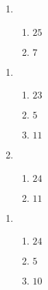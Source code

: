 \documentclass[12pt,twoside]{article}
\makeatletter
\def\emptycleardoublepage{\clearpage\if@twoside \ifodd\c@page\else
\thispagestyle{empty}%
\hbox{}\newpage\if@twocolumn\hbox{}\newpage\fi\fi\fi}
\makeatother
\begin{document}
\begin{multicols}{2}
\begin{enumerate}
\item \begin{enumerate}
\def \a{8}\def \b{17}\def \apb{25}
\item $\apb$
\def \a{10}\def \dif{7}\def \b{3}
\item $\dif$
\def \vshift{5}\def \hshift{4}\def \chang{0}\def \findval{4}\def \yval{5}
\end{enumerate}
\end{enumerate}\end{multicols}\emptycleardoublepage{}\graphicspath{{C:/Users/iainc/anaconda3/Randomizer/Sample Course/Sample Assessment 2/}}\begin{multicols}{2} \begin{enumerate}
\item \begin{enumerate}
\def \a{6}\def \b{17}\def \apb{23}
\item $\apb$
\def \a{12}\def \dif{5}\def \b{7}
\item $\dif$
\def \a{2}\def \b{9}\def \ab{11}
\item $\ab$
\def \vshift{1}\def \hshift{-4}\def \chang{-1}\def \findval{-5}\def \yval{3}
\end{enumerate}

\item \begin{enumerate}
\def \a{6}\def \b{18}\def \apb{24}
\item $\apb$
\def \a{2}\def \b{9}\def \ab{11}
\item $\ab$
\def \vshift{-1}\def \hshift{-4}\def \chang{2}\def \findval{-2}\def \yval{-5}
\end{enumerate}
\end{enumerate}\end{multicols}\emptycleardoublepage{}\graphicspath{{C:/Users/iainc/anaconda3/Randomizer/Sample Course/Sample Assessment 2/}}\begin{multicols}{2} \begin{enumerate}
\item \begin{enumerate}
\def \a{7}\def \b{17}\def \apb{24}
\item $\apb$
\def \a{14}\def \dif{5}\def \b{9}
\item $\dif$
\def \a{2}\def \b{8}\def \ab{10}
\item $\ab$
\def \vshift{1}\def \hshift{-2}\def \chang{-1}\def \findval{-3}\def \yval{3}
\end{enumerate}


\end{enumerate}
\end{multicols}
\end{document}
